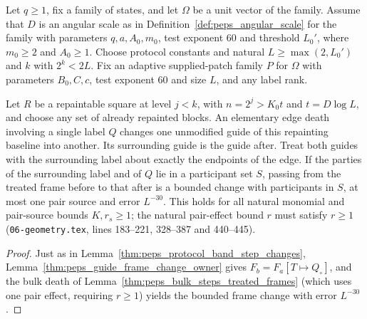 \begin{lemma}
    \label{thm:peps_protocol_band_death_change}
    \leanok
    Let $q\ge1$, fix a family of states, and let $\Omega$ be a unit vector of the family.
    Assume that $D$ is an angular scale as in Definition~\ref{def:peps_angular_scale} for
    the family with parameters $q,a,A_0,m_0$, test
    exponent $60$ and threshold $L_0'$, where $m_0\ge2$ and $A_0\ge1$. Choose protocol
    constants and natural $L\ge\max(2,L_0')$ and $k$ with $2^k<2L$. Fix an adaptive
    supplied-patch family $P$ for $\Omega$ with parameters $B_0,C,c$, test exponent $60$ and
    size $L$, and any label rank.

    Let $R$ be a repaintable square at level $j<k$, with $n=2^j>K_0t$ and $t=D\log L$, and
    choose any set of already repainted blocks. An elementary edge death involving a single
    label $Q$ changes one unmodified guide of this repainting baseline into another. Its
    surrounding guide is the guide after. Treat both guides with the surrounding label about
    exactly the endpoints of the edge. If the parties of the surrounding label and of $Q$ lie
    in a participant set $S$, passing from the treated frame before to that after is a bounded
    change with participants in $S$, at most one pair source and error $L^{-30}$. This holds
    for all natural monomial and pair-source bounds $K,r_s\ge1$; the natural pair-effect bound
    $r$ must satisfy $r\ge1$ (\texttt{06-geometry.tex}, lines 183--221, 328--387 and
    440--445).
\end{lemma}

\begin{proof}\leanok
    Just as in Lemma~\ref{thm:peps_protocol_band_step_changes}, Lemma~\ref{thm:peps_guide_frame_change_owner} gives $F_b=F_a[T\mapsto Q_\circ]$, and the bulk death of Lemma~\ref{thm:peps_bulk_steps_treated_frames} (which uses one pair effect, requiring $r\ge1$) yields the bounded frame change with error $L^{-30}$.
\end{proof}


